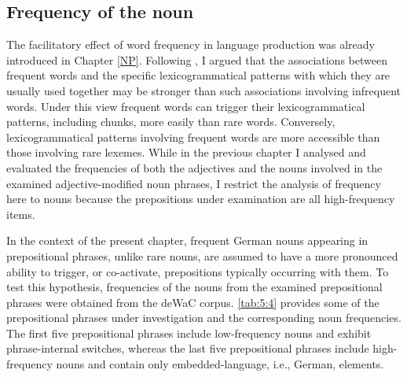 \subsection{Frequency of the noun}

The facilitatory effect of word frequency in language production was already introduced in Chapter \ref{NP}. Following \citep[115]{macwhinney1997}, I argued that the associations between frequent words and the specific lexicogrammatical patterns with which they are usually used together may be stronger than such associations involving infrequent words. Under this view frequent words can trigger their lexicogrammatical patterns, including chunks, more easily than rare words. Conversely, lexicogrammatical patterns involving frequent words are more accessible than those involving rare lexemes. While in the previous chapter I analysed and evaluated the frequencies of both the adjectives and the nouns involved in the examined adjective-modified noun phrases, I restrict the analysis of frequency here to nouns because the prepositions under examination are all high-frequency items. 

In the context of the present chapter, frequent German nouns appearing in prepositional phrases, unlike rare nouns, are assumed to have a more pronounced ability to trigger, or co-activate, prepositions typically occurring with them. To test this hypothesis, frequencies of the nouns from the examined prepositional phrases were obtained from the deWaC corpus. \ref{tab:5:4} provides some of the prepositional phrases under investigation and the corresponding noun frequencies. The first five prepositional phrases include low-frequency nouns and exhibit phrase-internal switches, whereas the last five prepositional phrases include high-fre\-quen\-cy nouns and contain only embedded-language, i.e., German, elements.

